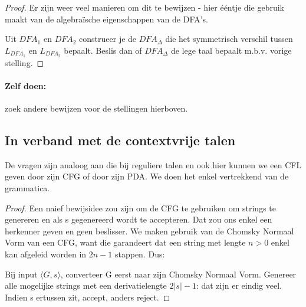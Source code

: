 \begin{proof}
Er zijn weer veel manieren om dit te bewijzen - hier \'{e}\'{e}ntje die
gebruik maakt van de algebra\"{i}sche eigenschappen van de DFA's.


Uit $DFA_1$ en $DFA_2$ construeer je de $DFA_\Delta$ die het symmetrisch
verschil tussen $L_{DFA_1}$ en $L_{DFA_2}$ bepaalt. Beslis dan of
$DFA_\Delta$ de lege taal bepaalt m.b.v. vorige stelling.
\end{proof}


\paragraph{Zelf doen:} zoek andere bewijzen voor de stellingen hierboven.

\subsection{In verband met de contextvrije talen}

De vragen zijn analoog aan die bij reguliere talen en ook hier kunnen
we een CFL geven door zijn CFG of door zijn PDA. We doen het enkel
vertrekkend van de grammatica.


\begin{proof}
Een naief bewijsidee zou zijn om de CFG te gebruiken om strings te
genereren en als s gegenereerd wordt te accepteren. Dat zou ons enkel
een herkenner geven en geen beslisser. We maken gebruik van de Chomsky
Normaal Vorm van een CFG, want die garandeert dat een string met
lengte $n > 0$ enkel kan afgeleid worden in $2n-1$ stappen. Dus:


Bij input $\langle G,s \rangle$, converteer G eerst naar zijn Chomsky Normaal
Vorm. Genereer alle mogelijke strings met een derivatielengte $2|s|-1$:
dat zijn er eindig veel. Indien s ertussen zit, accept, anders reject.
\end{proof} 


